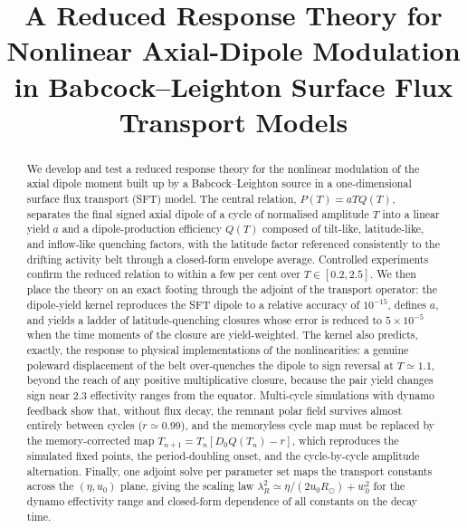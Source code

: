 \documentclass[namedreferences,hyperref,optionalrh,solaromanenum]{spr-sola}
\begin{document}
\begin{frontmatter}

\title{A Reduced Response Theory for Nonlinear Axial-Dipole Modulation in
Babcock--Leighton Surface Flux Transport Models}



\begin{abstract}
We develop and test a reduced response theory for the nonlinear modulation
of the axial dipole moment built up by a Babcock--Leighton source in a
one-dimensional surface flux transport (SFT) model. The central relation,
$P(T)=aTQ(T)$, separates the final signed axial dipole of a cycle of
normalised amplitude $T$ into a linear yield $a$ and a dipole-production
efficiency $Q(T)$ composed of tilt-like, latitude-like, and inflow-like
quenching factors, with the latitude factor referenced consistently to the
drifting activity belt through a closed-form envelope average. Controlled
experiments confirm the reduced relation to within a few per cent over
$T\in[0.2,2.5]$. We then place the theory on an exact footing through the
adjoint of the transport operator: the dipole-yield kernel reproduces the
SFT dipole to a relative accuracy of $10^{-15}$, defines $a$, and yields a
ladder of latitude-quenching closures whose error is reduced to
$5\times10^{-5}$ when the time moments of the closure are yield-weighted.
The kernel also predicts, exactly, the response to physical implementations
of the nonlinearities: a genuine poleward displacement of the belt
over-quenches the dipole to sign reversal at $T\simeq1.1$, beyond the reach
of any positive multiplicative closure, because the pair yield changes sign
near $2.3$ effectivity ranges from the equator. Multi-cycle simulations
with dynamo feedback show that, without flux decay, the remnant polar field
survives almost entirely between cycles ($r\simeq0.99$), and the memoryless
cycle map must be replaced by the memory-corrected map
$T_{n+1}=T_n[D_0Q(T_n)-r]$, which reproduces the simulated fixed points,
the period-doubling onset, and the cycle-by-cycle amplitude alternation.
Finally, one adjoint solve per parameter set maps the transport constants
across the $(\eta,u_0)$ plane, giving the scaling law
$\lambda_R^2\simeq\eta/(2u_0R_\odot)+w_0^2$ for the dynamo effectivity
range and closed-form dependence of all constants on the decay time.
\end{abstract}


\end{frontmatter}
\end{document}
